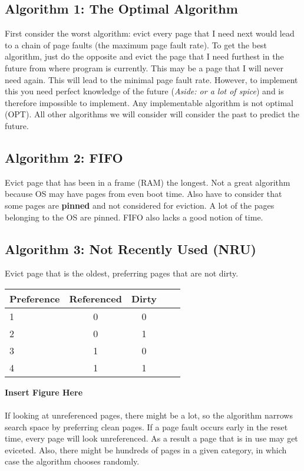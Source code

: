 \documentclass[../base_file/cs1550_notes.tex]{subfiles}
\begin{document}
\subsection{Algorithm 1: The Optimal Algorithm}
First consider the worst algorithm: evict every page that I need next would lead to a chain of page faults (the maximum page fault rate).
To get the best algorithm, just do the opposite and evict the page that I need furthest in the future from where program is currently.
This may be a page that I will never need again.  This will lead to the minimal page fault rate.  However, to implement this you need
perfect knowledge of the future (\textit{Aside: or a lot of spice}) and is therefore impossible to implement.  Any implementable algorithm
is not optimal (OPT).  All other algorithms we will consider will consider the past to predict the future.
\subsection{Algorithm 2: FIFO}
Evict page that has been in a frame (RAM) the longest.  Not a great algorithm because OS may have pages from even boot time.  Also have to
consider that some pages are \textbf{pinned} and not considered for eviction.  A lot of the pages belonging to the OS are pinned.  FIFO
also lacks a good notion of time.
\subsection{Algorithm 3: Not Recently Used (NRU)}
Evict page that is the oldest, preferring pages that are not dirty.
\begin{center}
\begin{tabular}{l*{3}{c}r}
Preference & Referenced & Dirty\\
\hline
1 & 0 & 0\\
2 & 0 & 1\\
3 & 1 & 0\\
4 & 1 & 1\\
\end{tabular}
\end{center}
\textbf{Insert Figure Here}\\\\
If looking at unreferenced pages, there might be a lot, so the algorithm narrows search space by preferring clean pages.  If a page fault
occurs early in the reset time, every page will look unreferenced.  As a result a page that is in use may get eviceted.  Also, there might
be hundreds of pages in a given category, in which case the algorithm chooses randomly.
\end{document}
